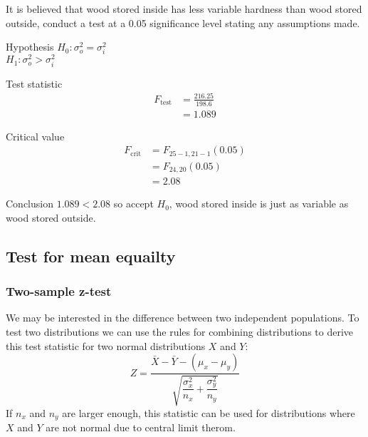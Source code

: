         \begin{example}
        {
            It is believed that wood stored inside has less variable hardness than wood stored outside, conduct a test at a 0.05 significance level stating any assumptions made.
        }

        \begin{step}{Hypothesis}
        $H_0: \sigma_o^2 = \sigma_i^2$\\ 
        $H_1: \sigma_o^2 > \sigma_i^2$
        \end{step}

        \begin{step}{Test statistic}
        \begin{align*} 
        F_{\text{test}} &= \frac{216.25}{198.6}\\ 
        &= 1.089 
        \end{align*}
        \end{step}

        \begin{step}{Critical value}
        \begin{align*} 
        F_{\text{crit}} &= F_{25-1, 21-1}(0.05)\\ 
        &= F_{24, 20}(0.05)\\ 
        &= 2.08 
        \end{align*}
        \end{step}

        \begin{step}{Conclusion}
        $1.089 < 2.08$ so accept $H_0$, wood stored inside is just as variable as wood stored outside.
        \end{step}

        \end{example}


    \subsection{Test for mean equailty}

        \subsubsection{Two-sample z-test}
            We may be interested in the difference between two independent populations. To test two distributions we can use the rules for combining distributions to derive this test statistic for two normal distributions $X$ and $Y$: 
            $$Z = \frac{\bar{X} - \bar{Y} - (\mu_x - \mu_y)} {\sqrt{\dfrac{\sigma_x^2}{n_x}+\dfrac{\sigma_y^2}{n_y}}} $$
            If $n_x$ and $n_y$ are larger enough, this statistic can be used for distributions where $X$ and $Y$ are not normal due to central limit therom.

